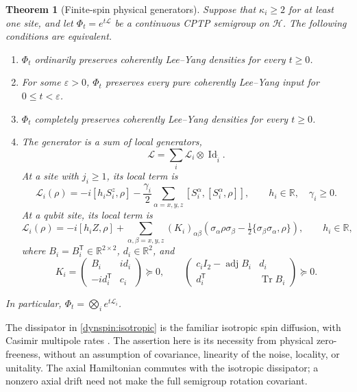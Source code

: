 \documentclass[reqno]{amsart}
\newtheorem{theorem}{Theorem}[section]
\theoremstyle{definition}
\theoremstyle{remark}
\newcommand{\R}{\mathbb R}
\DeclareMathOperator{\Tr}{Tr}
\DeclareMathOperator{\Id}{Id}
\begin{document}
\begin{theorem}[Finite-spin physical generators]\label{dyn:arbitrary-spin}
Suppose that $\kappa_i\geq2$ for at least one site, and let
$\Phi_t=e^{t\mathcal L}$ be a continuous CPTP semigroup on $\mathcal H$.
The following conditions are equivalent.
\begin{enumerate}
\item $\Phi_t$ ordinarily preserves coherently Lee--Yang densities for
      every $t\geq0$.
\item For some $\varepsilon>0$, $\Phi_t$ preserves every pure coherently
      Lee--Yang input for $0\leq t<\varepsilon$.
\item $\Phi_t$ completely preserves coherently Lee--Yang densities for
      every $t\geq0$.
\item The generator is a sum of local generators,
\begin{equation}\label{dynspin:locality}
 \mathcal L=\sum_i\mathcal L_i\otimes\Id_{\widehat i}.
\end{equation}
At a site with $j_i\geq1$, its local term is
\begin{equation}\label{dynspin:isotropic}
 \mathcal L_i(\rho)=-i[h_iS_i^z,\rho]
 -\frac{\gamma_i}{2}\sum_{\alpha=x,y,z}
       [S_i^\alpha,[S_i^\alpha,\rho]],
 \qquad h_i\in\R,\quad\gamma_i\geq0.
\end{equation}
At a qubit site, its local term is
\[
 \mathcal L_i(\rho)=-i[h_iZ,\rho]
 +\sum_{\alpha,\beta=x,y,z}(K_i)_{\alpha\beta}
 \left(\sigma_\alpha\rho\sigma_\beta
       -\tfrac12\{\sigma_\beta\sigma_\alpha,\rho\}\right),
 \qquad h_i\in\R,
\]
where $B_i=B_i^{\mathsf T}\in\R^{2\times2}$, $d_i\in\R^2$, and
\begin{equation}\label{dynspin:qubit-cone}
 K_i=\begin{pmatrix}B_i&i d_i\\-i d_i^{\mathsf T}&c_i\end{pmatrix}
 \succeq0,\qquad
 \begin{pmatrix}
 c_iI_2-\operatorname{adj}B_i&d_i\\
 d_i^{\mathsf T}&\Tr B_i
 \end{pmatrix}\succeq0.
\end{equation}
\end{enumerate}
In particular, $\Phi_t=\bigotimes_i e^{t\mathcal L_i}$.
\end{theorem}

The dissipator in \eqref{dynspin:isotropic} is the familiar isotropic
spin diffusion, with Casimir multipole rates
\cite{DenisMartin22,FilippovKuzhamuratova19}.  The assertion here is its
necessity from physical zero-freeness, without an assumption of covariance,
linearity of the noise, locality, or unitality.  The axial Hamiltonian
commutes with the isotropic dissipator; a nonzero axial drift need not
make the full semigroup rotation covariant.
\end{document}
